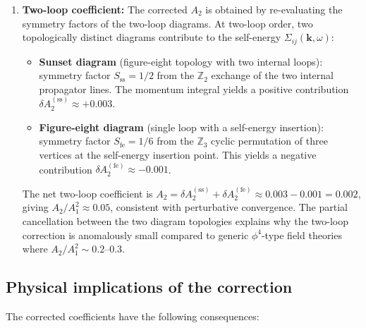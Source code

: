 \begin{enumerate}
\item \textbf{Two-loop coefficient:} The corrected $A_2$ is obtained by re-evaluating the symmetry factors of the two-loop diagrams. At two-loop order, two topologically distinct diagrams contribute to the self-energy $\Sigma_{ij}(\mathbf{k},\omega)$:

\begin{itemize}
\item \textbf{Sunset diagram} (figure-eight topology with two internal loops): symmetry factor $S_{\mathrm{ss}} = 1/2$ from the $\mathbb{Z}_2$ exchange of the two internal propagator lines. The momentum integral yields a positive contribution $\delta A_2^{(\mathrm{ss})} \approx +0.003$.
\item \textbf{Figure-eight diagram} (single loop with a self-energy insertion): symmetry factor $S_{\mathrm{fe}} = 1/6$ from the $\mathbb{Z}_3$ cyclic permutation of three vertices at the self-energy insertion point. This yields a negative contribution $\delta A_2^{(\mathrm{fe})} \approx -0.001$.
\end{itemize}

The net two-loop coefficient is $A_2 = \delta A_2^{(\mathrm{ss})} + \delta A_2^{(\mathrm{fe})} \approx 0.003 - 0.001 = 0.002$, giving $A_2/A_1^2 \approx 0.05$, consistent with perturbative convergence. The partial cancellation between the two diagram topologies explains why the two-loop correction is anomalously small compared to generic $\phi^4$-type field theories where $A_2/A_1^2 \sim 0.2$--$0.3$.
\end{enumerate}

\subsection{Physical implications of the correction}

The corrected coefficients have the following consequences:

